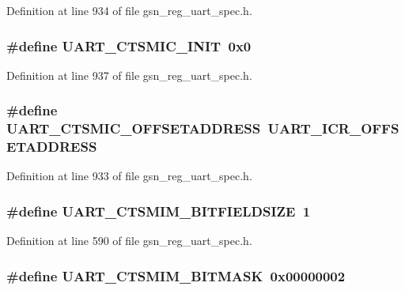 Definition at line 934 of file gsn\_\-reg\_\-uart\_\-spec.h.

\hypertarget{a00575_a650a216938467f1f0ab8149abef56dbc}{
\subsubsection[{UART\_\-CTSMIC\_\-INIT}]{\setlength{\rightskip}{0pt plus 5cm}\#define UART\_\-CTSMIC\_\-INIT~0x0}}
\label{a00575_a650a216938467f1f0ab8149abef56dbc}


Definition at line 937 of file gsn\_\-reg\_\-uart\_\-spec.h.

\hypertarget{a00575_ac119e85eee85a9d1ac2739b055033985}{
\subsubsection[{UART\_\-CTSMIC\_\-OFFSETADDRESS}]{\setlength{\rightskip}{0pt plus 5cm}\#define UART\_\-CTSMIC\_\-OFFSETADDRESS~UART\_\-ICR\_\-OFFSETADDRESS}}
\label{a00575_ac119e85eee85a9d1ac2739b055033985}


Definition at line 933 of file gsn\_\-reg\_\-uart\_\-spec.h.

\hypertarget{a00575_a15b84173ce8292efc0d48599ff27069f}{
\subsubsection[{UART\_\-CTSMIM\_\-BITFIELDSIZE}]{\setlength{\rightskip}{0pt plus 5cm}\#define UART\_\-CTSMIM\_\-BITFIELDSIZE~1}}
\label{a00575_a15b84173ce8292efc0d48599ff27069f}


Definition at line 590 of file gsn\_\-reg\_\-uart\_\-spec.h.

\hypertarget{a00575_acfe1ea3f8093c03b2d2f4486264fbbc8}{
\subsubsection[{UART\_\-CTSMIM\_\-BITMASK}]{\setlength{\rightskip}{0pt plus 5cm}\#define UART\_\-CTSMIM\_\-BITMASK~0x00000002}}
\label{a00575_acfe1ea3f8093c03b2d2f4486264fbbc8}


